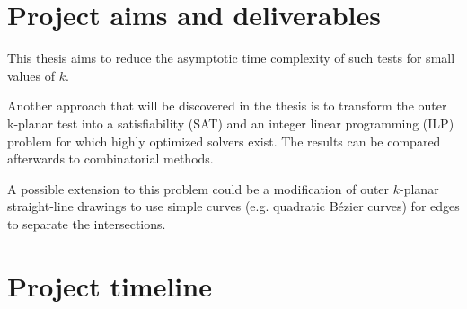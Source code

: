 \documentclass{article}
\begin{document}
\section{Project aims and deliverables}

This thesis aims to reduce the asymptotic time complexity of such tests for small values of \(k\). 

Another approach that will be discovered in the thesis is to transform the outer k-planar test into a satisfiability (SAT) and an integer linear programming (ILP) problem for which highly optimized solvers exist. The results can be compared afterwards to combinatorial methods.

A possible extension to this problem could be a modification of outer \(k\)-planar straight-line drawings to use simple curves (e.g. quadratic Bézier curves) for edges to separate the intersections.

\section{Project timeline}
\end{document}
